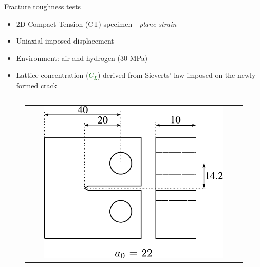 \documentclass[9pt]{beamer}
\begin{document}
\begin{frame}{Fracture toughness tests}


    \begin{itemize}
        \item 2D Compact Tension (CT) specimen - \textit{plane strain}
        \vspace{0.1cm}
        \item Uniaxial imposed displacement
        \vspace{0.1cm}
        \item Environment: air and hydrogen (30 MPa)
        \vspace{0.1cm}
        \item Lattice concentration (\textcolor{DarkGreen}{$C_L$}) derived from Sieverts' law imposed on the newly formed crack
    \end{itemize}

    \vspace{0.25cm}

    \begin{columns}

        \begin{column}{0.4\textwidth}

            \begin{figure}
                \begin{tabular}{c}
                    \includegraphics[width=0.85\textwidth]{Images/CT_specimen.pdf}\\
                \end{tabular}
            \end{figure}

        \end{column}
    

\end{columns}
\end{frame}
\end{document}
